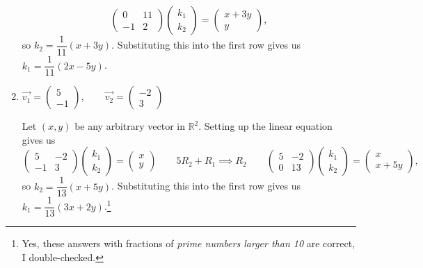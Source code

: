 \documentclass{article}
\begin{document}
\begin{enumerate}
\begin{solution}
\[\begin{pmatrix}
                0&11 \\ -1&2 
            \end{pmatrix} \begin{pmatrix}
                k_1\\k_2
            \end{pmatrix} = \begin{pmatrix}
                x+3y \\y
            \end{pmatrix},
        \] so \(k_2 = \dfrac{1}{11}(x+3y)\). Substituting this into the first row gives us \(k_1 = \dfrac{1}{11}(2x-5y)\).
    \end{solution}
    \item \(\overrightarrow{v_1} = \begin{pmatrix}
        5\\-1
    \end{pmatrix},\qquad\overrightarrow{v_2} = \begin{pmatrix}
        -2\\3
    \end{pmatrix}\)\begin{solution}
        Let \((x,y)\) be any arbitrary vector in \(\mathbb{R}^2\). Setting up the linear equation gives us\[
            \begin{pmatrix}
                5&-2\\-1&3
            \end{pmatrix} \begin{pmatrix}
                k_1\\k_2
            \end{pmatrix} = \begin{pmatrix}
                x\\y
            \end{pmatrix} \qquad 5R_2 + R_1 \implies R_2 \qquad \begin{pmatrix}
                5&-2 \\ 0&13 
            \end{pmatrix} \begin{pmatrix}
                k_1\\k_2
            \end{pmatrix} = \begin{pmatrix}
                x \\x+5y
            \end{pmatrix},
        \] so \(k_2 = \dfrac{1}{13}(x+5y)\). Substituting this into the first row gives us \(k_1 = \dfrac{1}{13}(3x + 2y)\).\footnote{Yes, these answers with fractions of \textit{prime numbers larger than 10} are correct, I double-checked.}
    \end{solution}
\end{enumerate}
\pagebreak 
\end{document}
